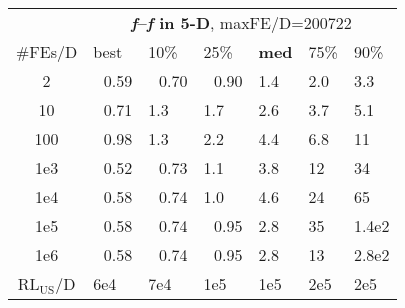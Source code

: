 \begin{tabular}{c|llllll}
 & \multicolumn{6}{|c}{\textbf{\textit{f}\raisebox{-0.35ex}{1}--\textit{f}\raisebox{-0.35ex}{24} in 5-D}, maxFE/D=200722}\\
\#FEs/D & best & 10\% & 25\% & \textbf{med} & 75\% & 90\%\\
2 & ~\,0.59 & ~\,0.70 & ~\,0.90 & \hspace*{1ex}1.4 & \hspace*{1ex}2.0 & \hspace*{1ex}3.3\\
10 & ~\,0.71 & \hspace*{1ex}1.3 & \hspace*{1ex}1.7 & \hspace*{1ex}2.6 & \hspace*{1ex}3.7 & \hspace*{1ex}5.1\\
100 & ~\,0.98 & \hspace*{1ex}1.3 & \hspace*{1ex}2.2 & \hspace*{1ex}4.4 & \hspace*{1ex}6.8 & 11\\
1e3 & ~\,0.52 & ~\,0.73 & \hspace*{1ex}1.1 & \hspace*{1ex}3.8 & 12 & 34\\
1e4 & ~\,0.58 & ~\,0.74 & \hspace*{1ex}1.0 & \hspace*{1ex}4.6 & 24 & 65\\
1e5 & ~\,0.58 & ~\,0.74 & ~\,0.95 & \hspace*{1ex}2.8 & 35 & 1.4e2\\
1e6 & ~\,0.58 & ~\,0.74 & ~\,0.95 & \hspace*{1ex}2.8 & 13 & 2.8e2\\
$\text{RL}_{\text{US}}$/D & 6e4 & 7e4 & 1e5 & 1e5 & 2e5 & 2e5
\end{tabular}
